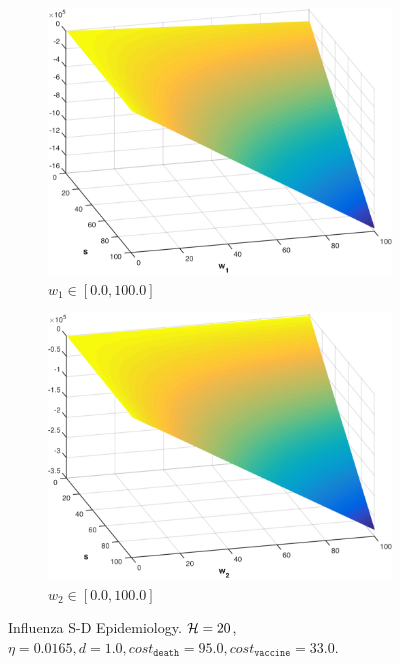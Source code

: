 \begin{figure}[t!]
    \centering
    \begin{subfigure}[b]{0.4\textwidth}
        \includegraphics[width=\linewidth, height=0.8\linewidth]{images/sd_w1}
        \caption{$ w_1 \in \left[ 0.0, 100.0 \right]$}
        \label{fig:opt_execution_w1}
        \vspace{1em}
    \end{subfigure}
    
    \begin{subfigure}[b]{0.4\textwidth}
        \includegraphics[width=\linewidth, height=0.8\linewidth]{images/sd_w2}
        \caption{$ w_2 \in \left[ 0.0, 100.0 \right]$}
        \label{fig:pt_execution_w2}
    \end{subfigure}  
    \caption{Influenza S-D Epidemiology. $ \mathcal{H} = 20 $, $ \eta = 0.0165, d = 1.0, cost_{\mathtt{death}} = 95.0, cost_{\mathtt{vaccine}} = 33.0$.}
    \label{fig:pt_execution}
\end{figure}


